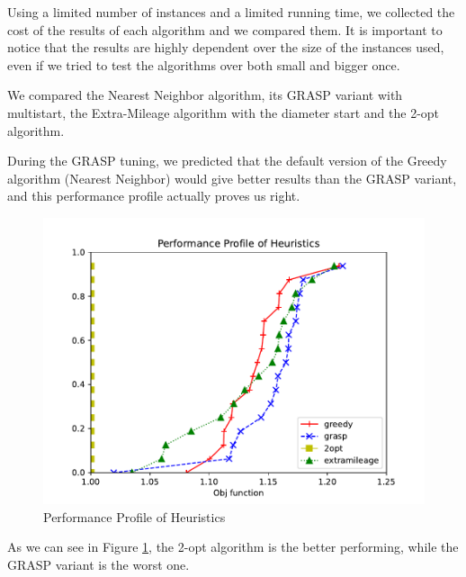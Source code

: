 Using a limited number of instances and a limited running time, we collected the cost of the results of each algorithm and we compared them. It is important to notice that the results are highly dependent over the size of the instances used, even if we tried to test the algorithms over both small and bigger once.

We compared the Nearest Neighbor algorithm, its GRASP variant with multistart, the Extra-Mileage algorithm with the diameter start and the 2-opt algorithm.

During the GRASP tuning, we predicted that the default version of the Greedy algorithm (Nearest Neighbor) would give better results than the GRASP variant, and this performance profile actually proves us right.

\begin{figure}[!h]
    \centering
    \includegraphics[width=\textwidth]{images/gge2.pdf}
    \caption{Performance Profile of Heuristics}
    \label{fig:gge2}
\end{figure}

As we can see in Figure \ref{fig:gge2}, the 2-opt algorithm is the better performing, while the GRASP variant is the worst one. 



